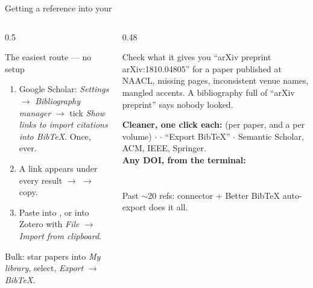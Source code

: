 \documentclass[aspectratio=169,11pt]{beamer}
\begin{document}
\begin{frame}{Getting a reference into your }
\begin{columns}[T]
\begin{column}{0.5\textwidth}
\begin{block}{The easiest route --- no setup}
\footnotesize
\begin{enumerate}
  \item Google Scholar: \emph{Settings} $\rightarrow$ \emph{Bibliography
        manager} $\rightarrow$ tick \emph{Show links to import citations into
        BibTeX}. Once, ever.
  \item A  link appears under every result $\rightarrow$
         $\rightarrow$ copy.
  \item Paste into , or into Zotero with \emph{File
        $\rightarrow$ Import from clipboard}.
\end{enumerate}
Bulk: star papers into \emph{My library}, select, \emph{Export} $\rightarrow$
\emph{BibTeX}.
\end{block}
\end{column}
\begin{column}{0.48\textwidth}
\begin{alertblock}{Check what it gives you}
\footnotesize
``arXiv preprint arXiv:1810.04805'' for a paper published at NAACL, missing
pages, inconsistent venue names, mangled accents. A bibliography full of
``arXiv preprint'' says nobody looked.
\end{alertblock}
\footnotesize
\textbf{Cleaner, one click each:}  (per paper, and a
 per volume) $\cdot$  $\cdot$  ``Export
BibTeX'' $\cdot$ Semantic Scholar, ACM, IEEE, Springer.\\[3pt]
\textbf{Any DOI, from the terminal:}\\
\\
\\[3pt]
Past $\sim$20 refs: connector + Better BibTeX auto-export does it all.
\end{column}
\end{columns}
\end{frame}
\end{document}
